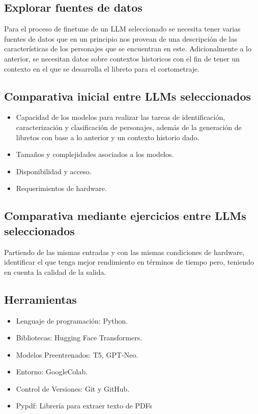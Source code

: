 \documentclass[journal,onecolumn]{IEEEtran}
\begin{document}
	\subsection{Explorar fuentes de datos}
	Para el proceso de finetune de un LLM seleccionado se necesita tener varias fuentes de datos que en un principio nos provean de una descripción de las características de los personajes que se encuentran en este. Adicionalmente a lo anterior, se necesitan datos sobre contextos historicos con el fin de tener un contexto en el que se desarrolla el libreto para el cortometraje.
	\subsection{Comparativa inicial entre LLMs seleccionados}
	\begin{itemize}
		\item Capacidad de los modelos para realizar las tareas de identificación, caracterización y clasificación de personajes, además de la generación de libretos con base a lo anterior y un contexto historio dado.
		\item Tamaños y complejidades asociados a los modelos.
		\item Disponibilidad y acceso.
		\item Requerimientos de hardware.
	\end{itemize}
	\subsection{Comparativa mediante ejercicios entre LLMs seleccionados}
	Partiendo de las mismas entradas y con las mismas condiciones de hardware, identificar el que tenga mejor rendimiento en términos de tiempo pero, teniendo en cuenta la calidad de la salida.
	\subsection{Herramientas}
	\begin{itemize}
		\item Lenguaje de programación: Python.
		\item Bibliotecas: Hugging Face Transformers.
		\item Modelos Preentrenados: T5, GPT-Neo.
		\item Entorno: GoogleColab.
		\item Control de Versiones: Git y GitHub.
		\item Pypdf: Librería para extraer texto de PDFs
	\end{itemize}
	
\end{document}
